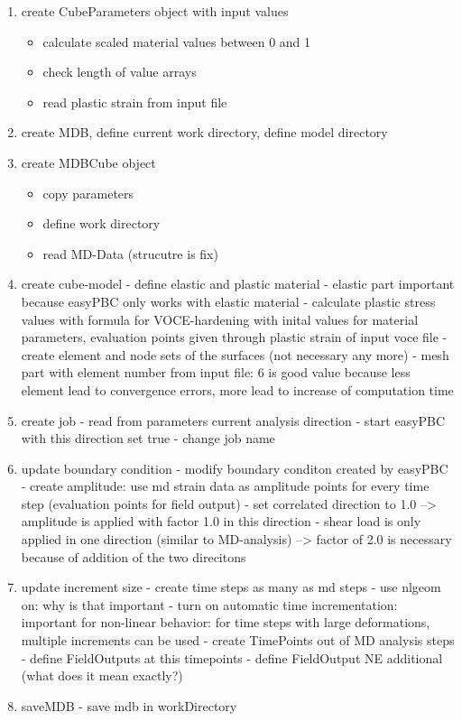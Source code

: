      \begin{enumerate}
        \item create CubeParameters object with input values 
            \begin{itemize}
                \item calculate scaled material values between 0 and 1 
                \item check length of value arrays 
                \item read plastic strain from input file
                
            \end{itemize}
        \item create MDB, define current work directory, define model directory
        \item create MDBCube object
            \begin{itemize}
                \item copy parameters
                \item define work directory
                \item read MD-Data (strucutre is fix)
            \end{itemize}
        \item create cube-model
            - define elastic and plastic material
            - elastic part important because easyPBC only works with elastic material 
            - calculate plastic stress values with formula for VOCE-hardening with inital values for material parameters, evaluation points given through plastic strain of input voce file
            - create element and node sets of the surfaces (not necessary any more)
            - mesh part with element number from input file: 6 is good value because less element lead to convergence errors, more lead to increase of computation time
        \item create job
            - read from parameters current analysis direction
            - start easyPBC with this direction set true 
            - change job name
        \item update boundary condition
            - modify boundary conditon created by easyPBC
            - create amplitude: use md strain data as amplitude points for every time step (evaluation points for field output)
            - set correlated direction to 1.0 --> amplitude is applied with factor 1.0 in this direction
            - shear load is only applied in one direction (similar to MD-analysis) --> factor of 2.0 is necessary because of addition of the two direcitons 
        \item update increment size
            - create time steps as many as md steps
            - use nlgeom on: why is that important
            - turn on automatic time incrementation: important for non-linear behavior: for time steps with large deformations, multiple increments can be used
            - create TimePoints out of MD analysis steps
            - define FieldOutputs at this timepoints
            - define FieldOutput NE additional (what does it mean exactly?)
        \item saveMDB
            - save mdb in workDirectory


\end{enumerate}
